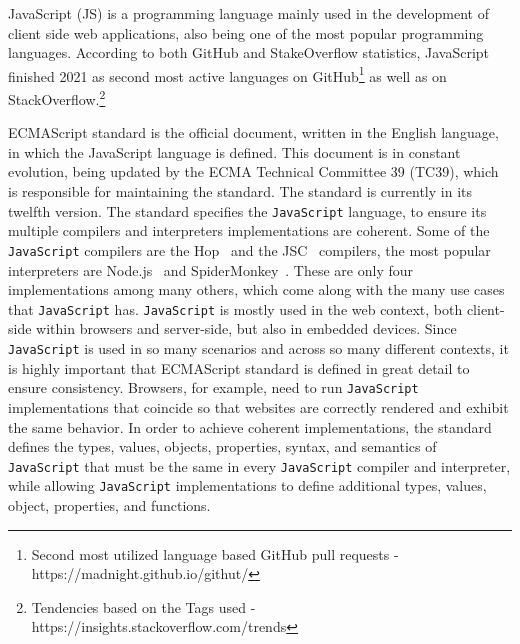 \documentclass[runningheads]{llncs}
\begin{document}
JavaScript (JS) is a programming language mainly used in the development of client side web applications, also being one of the most popular programming languages. According to both GitHub and StakeOverflow statistics, JavaScript finished 2021 as second most active languages on GitHub\footnote{Second most utilized language based GitHub pull requests - https://madnight.github.io/githut/} as well as on StackOverflow.\footnote{Tendencies based on the Tags used - https://insights.stackoverflow.com/trends}



ECMAScript standard\cite{ECMAScript} is the official document, written in the English language, in which the JavaScript language is defined. This document is in constant evolution, being updated by the ECMA Technical Committee 39 (TC39), which is responsible for maintaining the standard. The standard is currently in its twelfth version. 
%
The standard specifies the \texttt{JavaScript} language, to ensure its multiple compilers and interpreters implementations are coherent. Some of the \texttt{JavaScript} compilers are the Hop~\cite{Hop} and the JSC~\cite{JSC} compilers, the most popular interpreters are Node.js~\cite{Node.js} and SpiderMonkey~\cite{SpiderMonkey}. These are only four implementations among many others, which come along with the many use cases that \texttt{JavaScript} has.
%
\texttt{JavaScript} is mostly used in the web context, both client-side within browsers and server-side, but also in embedded devices. Since \texttt{JavaScript} is used in so many scenarios and across so many different contexts, it is highly important that ECMAScript standard is defined in great detail to ensure consistency. Browsers, for example, need to run \texttt{JavaScript} implementations that coincide so that websites are correctly rendered and exhibit the same behavior. In order to achieve coherent implementations, the standard defines the types, values, objects, properties, syntax, and semantics of \texttt{JavaScript} that must be the same in every \texttt{JavaScript} compiler and interpreter, while allowing \texttt{JavaScript} implementations to define additional types, values, object, properties, and functions.
\end{document}
